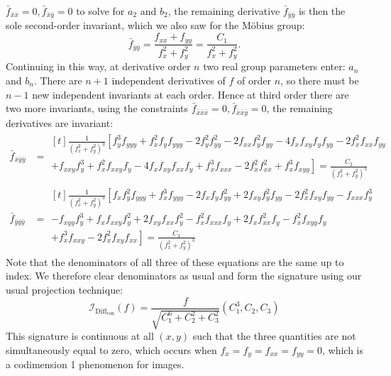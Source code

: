 \documentclass{artjlt}
\begin{document}
$\bar{f}_{\bar{x}\bar{x}} = 0, \bar{f}_{\bar{x}\bar{y}} = 0$ to solve for
$a_2$ and $b_2$, the remaining derivative $\bar{f}_{\bar{y}\bar{y}}$ is then the
sole second-order invariant, which we also saw for the M\"obius group: 
\begin{equation}
    \bar{f}_{\bar{y}\bar{y}} = \frac{f_{xx} + f_{yy}}{f_x^2 + f_y^2} =
    \frac{C_1}{f_x^2 + f_y^2}.
\label{eqn:C1}
\end{equation}
Continuing in this way, at derivative order $n$ two real group parameters
enter: $a_n$ and $b_n$. There are $n+1$ independent derivatives of $f$ of
order $n$, so there must be $n-1$ new independent invariants at each order.
Hence at third order there are two more invariants, using the constraints
$\bar{f}_{\bar{x}\bar{x}\bar{x}} = 0, \bar{f}_{\bar{x}\bar{x}\bar{y}} = 0$,
the remaining derivatives are invariant:
\begin{align}
    \bar{f}_{\bar{x}\bar{y}\bar{y}} &= 
    \begin{multlined}[t]
        \frac{1}{(f_x^2 + f_y^2)^3} \left[
f_y^3f_{yyy} + f_x^2f_yf_{yyy}
            -2f_y^2f_{yy}^2 - 2f_{xx}f_y^2f_{yy} -
            4f_xf_{xy}f_yf_{yy} - 2f_x^2 f_{xx}f_{yy} \right. \\ 
+ \left. f_{xxy}f_y^3 +
            f_x^2 f_{xxy}f_y - 4 f_x f_{xy} f_{xx} f_y + f_x^3 f_{xxx} -
    2f_x^2 f_{xx}^2 + f_x^3 f_{xyy} \right]
    = \frac{C_2}{(f_x^2 +
f_y^2)^3}\end{multlined} \\
    \bar{f}_{\bar{y}\bar{y}\bar{y}} &= 
    \begin{multlined}[t]
        \frac{1}{(f_x^2 + f_y^2)^3} \left[
f_xf_y^2f_{yyy} +
        f_x^3f_{yyy} - 2f_x f_y f_{yy}^2 + 2f_{xy}f_y^2f_{yy} -
    2f_x^2f_{xy}f_{yy} - f_{xxx}f_y^3 \right. \\ 
-  f_{xyy}f_y^3 + f_xf_{xxy}f_y^2 +
2f_{xy}f_{xx}f_y^2 - f_x^2 f_{xxx} f_y + 2f_xf_{xx}^2 f_y - f_x^2 f_{xyy}
f_y \\\left.+ f_x^3 f_{xxy} - 2f_x^2 f_{xy} f_{xx}\right]
= \frac{C_3}{(f_x^2 + f_y^2)^3}
\end{multlined}\label{eqn:C3}
\end{align}
Note that the denominators of all three of these equations are the same up
to index. We therefore clear denominators as usual and form the
signature using our usual projection technique:
\begin{equation}
    \label{eq:conformalsignature}
\mathcal{I}_{\text{Diff}_\text{con}}(f) = \frac{f}{\sqrt{C_1^6 + C_2^2 +
C_3^2}}(C_1^3, C_2, C_3)
\end{equation}
This signature is continuous at all $(x,y)$ such that the three quantities
are not simultaneously equal to zero, which occurs when $f_x = f_y = f_{xx}
= f_{yy} = 0$, which is a codimension 1 phenomenon for images.
\end{document}
